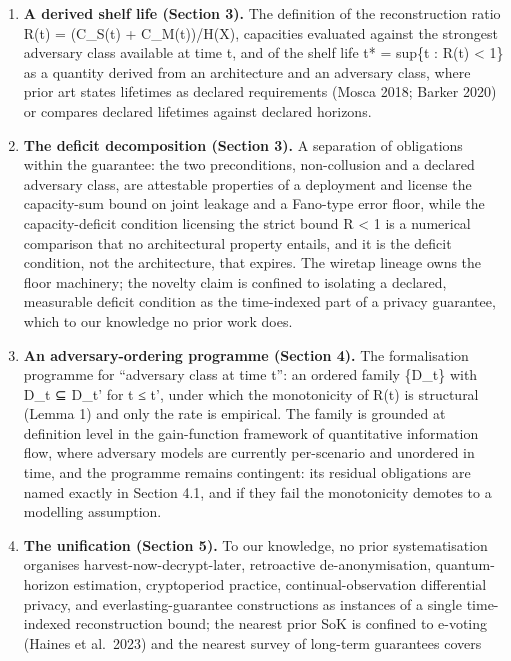 \documentclass[
]{llncs}
\providecommand{\tightlist}{%
  \setlength{\itemsep}{0pt}\setlength{\parskip}{0pt}}
\begin{document}
\begin{enumerate}
\def\labelenumi{\arabic{enumi}.}
\tightlist
\item
  \textbf{A derived shelf life (Section 3).} The definition of the
  reconstruction ratio R(t) = (C\_S(t) + C\_M(t))/H(X), capacities
  evaluated against the strongest adversary class available at time t,
  and of the shelf life t* = sup\{t : R(t) \textless{} 1\} as a quantity
  derived from an architecture and an adversary class, where prior art
  states lifetimes as declared requirements (Mosca 2018; Barker 2020) or
  compares declared lifetimes against declared horizons.
\item
  \textbf{The deficit decomposition (Section 3).} A separation of
  obligations within the guarantee: the two preconditions, non-collusion
  and a declared adversary class, are attestable properties of a
  deployment and license the capacity-sum bound on joint leakage and a
  Fano-type error floor, while the capacity-deficit condition licensing
  the strict bound R \textless{} 1 is a numerical comparison that no
  architectural property entails, and it is the deficit condition, not
  the architecture, that expires. The wiretap lineage owns the floor
  machinery; the novelty claim is confined to isolating a declared,
  measurable deficit condition as the time-indexed part of a privacy
  guarantee, which to our knowledge no prior work does.
\item
  \textbf{An adversary-ordering programme (Section 4).} The
  formalisation programme for ``adversary class at time t'': an ordered
  family \{D\_t\} with D\_t ⊆ D\_t' for t ≤ t', under which the
  monotonicity of R(t) is structural (Lemma 1) and only the rate is
  empirical. The family is grounded at definition level in the
  gain-function framework of quantitative information flow, where
  adversary models are currently per-scenario and unordered in time, and
  the programme remains contingent: its residual obligations are named
  exactly in Section 4.1, and if they fail the monotonicity demotes to a
  modelling assumption.
\item
  \textbf{The unification (Section 5).} To our knowledge, no prior
  systematisation organises harvest-now-decrypt-later, retroactive
  de-anonymisation, quantum-horizon estimation, cryptoperiod practice,
  continual-observation differential privacy, and everlasting-guarantee
  constructions as instances of a single time-indexed reconstruction
  bound; the nearest prior SoK is confined to e-voting (Haines et
  al.~2023) and the nearest survey of long-term guarantees covers

\end{enumerate}
\end{document}

